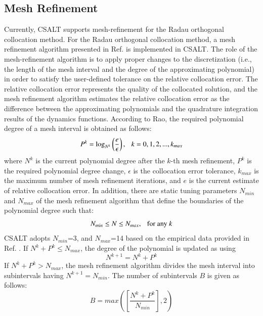 \documentclass[ISTS  ]{tjsass} %
\begin{document}
\subsection{Mesh Refinement}

Currently, CSALT supports mesh-refinement for the Radau orthogonal collocation method. For the Radau orthogonal collocation method, a mesh refinement algorithm presented in Ref.  is implemented in CSALT. The role of the mesh-refinement algorithm is to apply proper changes to the discretization (i.e., the length of the mesh interval and the degree of the approximating polynomial) in order to satisfy the user-defined tolerance on the relative collocation error. The relative collocation error represents the quality of the collocated solution, and the mesh refinement algorithm estimates the relative collocation error as the difference between the approximating polynomials and the quadrature integration results of the dynamics functions. According to Rao\cite{Rao:c}, the required polynomial degree of a mesh interval is obtained as follows:
%
\begin{equation}
   P^k= \log_{N^k}\left( \frac{e}{\epsilon}\right), \hspace{0.1 in}  k=0,1,2,...,k_{max}
\end{equation}
%
where ${N^k}$ is the current polynomial degree after the $k$-th mesh refinement, $P^k$ is the required polynomial degree change, $\epsilon$ is the collocation error tolerance, $k_{max}$ is the maximum number of mesh refinement iterations, and $e$ is the current estimate of relative collocation error. In addition, there are static tuning parameters  $N_{min}$ and $N_{max}$ of the mesh refinement algorithm that define the boundaries of the polynomial degree such that:
%
\begin{equation}
   N_{min} \leq N \leq N_{max}, \hspace{0.1 in}  \mbox{for any $k$}
\end{equation}
%
CSALT adopts $N_{min}$=3, and $N_{max}$=14 based on the empirical data provided in Ref. . If $N^k+P^k \leq N_{max}$, the degree of the polynomial is updated as using
%
\begin{equation}
   N^{k+1} = N^k+P^k
\end{equation}
%
If $N^k+P^k > N_{max}$, the mesh refinement algorithm divides the mesh interval into subintervals having $N^{k+1}=N_{min}$. The number of subintervals $B$ is given as follows:
%
\begin{equation}
   B=max(\left[\frac{N^k+P^k}{N_{min}}\right],2)
\end{equation}
\end{document}

